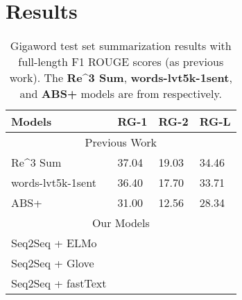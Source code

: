 \section{Results}
\label{sec: result}

\begin{table}[ht]
\centering
\caption{Gigaword test set summarization results with full-length F1 ROUGE scores (as previous work). The \textbf{Re\^{}3 Sum}, \textbf{words-lvt5k-1sent}, and \textbf{ABS+} models are from \cite{cao2018retrieve, nallapati2016abstractive, rush2015neural} respectively.}
\begin{tabular}{|l|l|l|l|} 
\hline
Models                                        & \multicolumn{1}{c|}{RG-1} & \multicolumn{1}{c|}{RG-2} & \multicolumn{1}{c|}{RG-L}  \\ 
\hline
\multicolumn{4}{|c|}{Previous Work}                                                                                                         \\ 
\hline
Re\^{}3 Sum         & 37.04                        & 19.03                        & 34.46                         \\ 
\hline
words-lvt5k-1sent & 36.40                        & 17.70                        & 33.71                         \\ 
\hline
ABS+               & 31.00                        & 12.56                        & 28.34                         \\ 
\hline
\multicolumn{4}{|c|}{Our Models}                                                                                                            \\ 
\hline
Seq2Seq + ELMo                                &                              &                              &                               \\ 
\hline
Seq2Seq + Glove                               &                              &                              &                               \\ 
\hline
Seq2Seq + fastText                            &                              &                              &                               \\
\hline
\end{tabular}
\label{tab: compare_embed}
\end{table}


